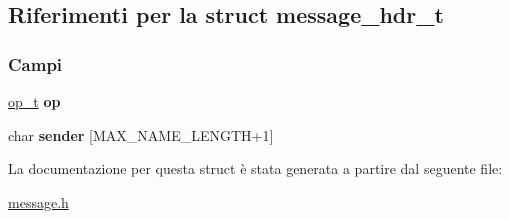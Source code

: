 \hypertarget{structmessage__hdr__t}{}\subsection{Riferimenti per la struct message\+\_\+hdr\+\_\+t}
\label{structmessage__hdr__t}
\subsubsection*{Campi}
\begin{DoxyCompactItemize}
\item 
\mbox{\label{structmessage__hdr__t_ab7f4eacc8e900cca79b63ddfb02d67fd}} 
\mbox{\hyperlink{ops_8h_ac6fa1b34da8872e34c2936391332f44c}{op\+\_\+t}} {\bfseries op}
\item 
\mbox{\label{structmessage__hdr__t_a53c6bc32851e00a0fe818315d5029f43}} 
char {\bfseries sender} \mbox{[}M\+A\+X\+\_\+\+N\+A\+M\+E\+\_\+\+L\+E\+N\+G\+TH+1\mbox{]}
\end{DoxyCompactItemize}


La documentazione per questa struct è stata generata a partire dal seguente file\+:\begin{DoxyCompactItemize}
\item 
\mbox{\hyperlink{message_8h}{message.\+h}}\end{DoxyCompactItemize}
